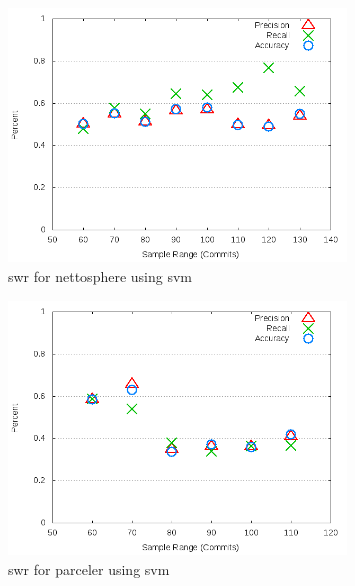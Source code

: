 \begin{figure}[!t]
\centering
\includegraphics[width=0.8\textwidth]{images/svm/test_1/nettosphere_sample_range.png}
\caption{\gls{swr} for nettosphere using \gls{svm}}
\label{fig:test_1_nettosphere_svm}
\end{figure}

\begin{figure}[!t]
\centering
\includegraphics[width=0.8\textwidth]{images/svm/test_1/parceler_sample_range.png}
\caption{\gls{swr} for parceler using \gls{svm}}
\label{fig:test_1_parceler_svm}
\end{figure}

